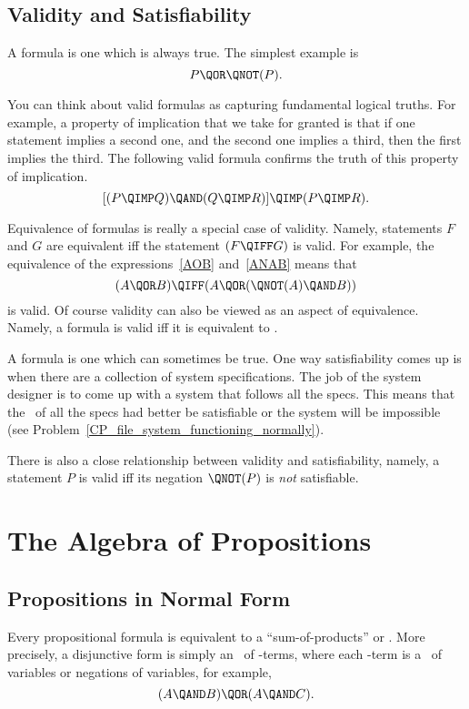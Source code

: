 \subsection{Validity and Satisfiability}
A  formula is one which is always true.  The simplest example is
\[
P \QOR \QNOT(P).
\]

You can think about valid formulas as capturing fundamental logical
truths.  For example, a property of implication that we take for
granted is that if one statement implies a second one, and the second
one implies a third, then the first implies the third.  The following
valid formula confirms the truth of this property of implication.
\[
[(P \QIMP Q) \QAND (Q \QIMP R)] \QIMP (P \QIMP R).
\]

Equivalence of formulas is really a special case of validity.  Namely,
statements $F$ and $G$ are equivalent iff the statement $(F \QIFF G)$ is
valid.  For example, the equivalence of the expressions~\ref{AOB}
and~\ref{ANAB} means that
\[
(A \QOR B) \QIFF (A \QOR (\QNOT(A) \QAND B))
\]
is valid.  Of course validity can also be viewed as an aspect of
equivalence.  Namely, a formula is valid iff it is equivalent
to \true.

A  formula is one which can sometimes be true.  One
way satisfiability comes up is when there are a collection of system
specifications.  The job of the system designer is to come up with a
system that follows all the specs.  This means that the \QAND\ of all
the specs had better be satisfiable or the system will be impossible
(see Problem~\ref{CP_file_system_functioning_normally}).

There is also a close relationship between validity and
satisfiability, namely, a statement $P$ is valid iff its negation
$\QNOT(P)$ is \emph{not} satisfiable.

\begin{problems}
\practiceproblems
{}

\classproblems
{}
\end{problems}


\section{The Algebra of Propositions}

\subsection{Propositions in Normal Form}
Every propositional formula is equivalent to a ``sum-of-products''
or .  More precisely, a disjunctive form is
simply an \QOR\ of \QAND-terms, where each \QAND-term is a \QAND\ of
variables or negations of variables, for example, 
\begin{equation}\label{ANBOANC}
(A \QAND B) \QOR (A \QAND C).
\end{equation}

